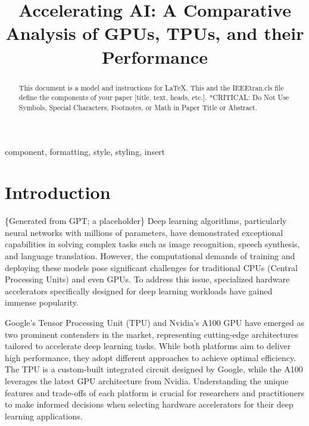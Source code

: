 \documentclass[conference]{IEEEtran}
\begin{document}
    \title{Accelerating AI: A Comparative Analysis of GPUs, TPUs, and their Performance}

    \author{
    }

    \maketitle

    \begin{abstract}
        This document is a model and instructions for \LaTeX.
        This and the IEEEtran.cls file define the components of your paper [title, text, heads, etc.].
        *CRITICAL: Do Not Use Symbols, Special Characters, Footnotes,
        or Math in Paper Title or Abstract.
    \end{abstract}

    \begin{IEEEkeywords}
        component, formatting, style, styling, insert
    \end{IEEEkeywords}


    \section{Introduction}
    \label{sec:introduction}

    \{Generated from GPT; a placeholder\}
    Deep learning algorithms, particularly neural networks with millions of parameters, have demonstrated exceptional capabilities in solving complex tasks such as image recognition, speech synthesis, and language translation.
    However, the computational demands of training and deploying these models pose significant challenges for traditional CPUs (Central Processing Units) and even GPUs.
    To address this issue, specialized hardware accelerators specifically designed for deep learning workloads have gained immense popularity.

    Google's Tensor Processing Unit (TPU) and Nvidia's A100 GPU have emerged as two prominent contenders in the market, representing cutting-edge architectures tailored to accelerate deep learning tasks.
    While both platforms aim to deliver high performance, they adopt different approaches to achieve optimal efficiency.
    The TPU is a custom-built integrated circuit designed by Google, while the A100 leverages the latest GPU architecture from Nvidia.
    Understanding the unique features and trade-offs of each platform is crucial for researchers and practitioners to make informed decisions when selecting hardware accelerators for their deep learning applications.
\end{document}
